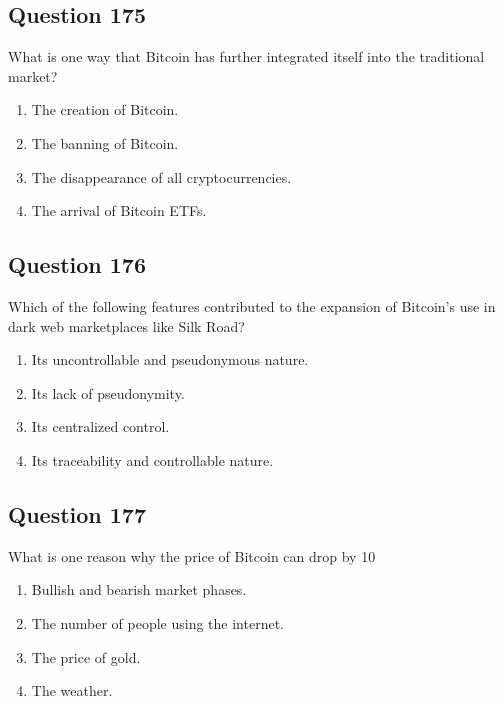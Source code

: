 \documentclass[12pt,a4paper]{article}
\begin{document}
\bigskip


\subsection*{Question 175}
What is one way that Bitcoin has further integrated itself into the traditional market?

\begin{enumerate}[label=\Alph*., leftmargin=*]
\item The creation of Bitcoin.
\item The banning of Bitcoin.
\item The disappearance of all cryptocurrencies.
\item The arrival of Bitcoin ETFs.
\end{enumerate}

\bigskip


\subsection*{Question 176}
Which of the following features contributed to the expansion of Bitcoin's use in dark web marketplaces like Silk Road?

\begin{enumerate}[label=\Alph*., leftmargin=*]
\item Its uncontrollable and pseudonymous nature.
\item Its lack of pseudonymity.
\item Its centralized control.
\item Its traceability and controllable nature.
\end{enumerate}

\bigskip


\subsection*{Question 177}
What is one reason why the price of Bitcoin can drop by 10%

\begin{enumerate}[label=\Alph*., leftmargin=*]
\item Bullish and bearish market phases.
\item The number of people using the internet.
\item The price of gold.
\item The weather.
\end{enumerate}
\end{document}
